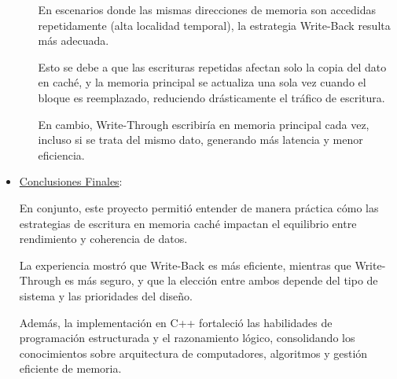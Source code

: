 \documentclass{article}
\begin{document}
\begin{itemize}
\begin{itemize}
        \quad

        En escenarios donde las mismas direcciones de memoria son accedidas repetidamente (alta localidad temporal), la estrategia Write-Back resulta más adecuada.

        \quad
        
        Esto se debe a que las escrituras repetidas afectan solo la copia del dato en caché, y la memoria principal se actualiza una sola vez cuando el bloque es reemplazado, reduciendo drásticamente el tráfico de escritura.

        \quad
        
        En cambio, Write-Through escribiría en memoria principal cada vez, incluso si se trata del mismo dato, generando más latencia y menor eficiencia.
        
    \end{itemize}
    


    \quad

    \item  {\underline{Conclusiones Finales}:}

    \quad

    {En conjunto, este proyecto permitió entender de manera práctica cómo las estrategias de escritura en memoria caché impactan el equilibrio entre rendimiento y coherencia de datos.}

    \quad

    {La experiencia mostró que Write-Back es más eficiente, mientras que Write-Through es más seguro, y que la elección entre ambos depende del tipo de sistema y las prioridades del diseño.}

    \quad

    {Además, la implementación en C++ fortaleció las habilidades de programación estructurada y el razonamiento lógico, consolidando los conocimientos sobre arquitectura de computadores, algoritmos y gestión eficiente de memoria.}    
    
\end{itemize} 
\end{document}
